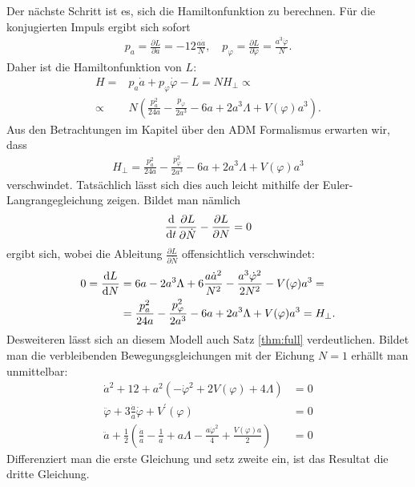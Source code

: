\documentclass{scrartcl}
\begin{document}
			Der nächste Schritt ist es, sich die Hamiltonfunktion zu berechnen. Für die konjugierten Impuls ergibt sich sofort
			\begin{align}
				p_a=\frac{\partial L}{\partial \dot{a}}=-12\frac{a\dot{a}}{N},\quad p_\varphi=\frac{\partial L}{\partial \dot{\varphi}}=\frac{a^3\dot{\varphi}}{N}.
			\end{align}
			Daher ist die Hamiltonfunktion von $L$:
			\begin{align*}
				H=&p_a \dot{a}+p_\varphi \dot{\varphi}-L=N H_\perp\propto\\
				\propto&N\left(\frac{p_a^2}{24a}-\frac{p_\varphi}{2a^3}-6a+2a^3\Lambda+V(\varphi)a^3\right).
			\end{align*}
			Aus den Betrachtungen im Kapitel über den ADM Formalismus erwarten wir, dass
			\begin{align*}
				H_\perp=\frac{p_a^2}{24a}-\frac{p_\varphi^2}{2a^3}-6a+2a^3\Lambda+V(\varphi)a^3
			\end{align*}
			verschwindet. Tatsächlich lässt sich dies auch leicht mithilfe der Euler-Langrangegleichung zeigen. Bildet man nämlich
			\begin{align*}
				\frac{{\rm d}}{{\rm d}t}\frac{\partial L}{\partial \dot{N}}-\frac{\partial L}{\partial N}=0
			\end{align*}
			ergibt sich, wobei die Ableitung $\frac{\partial L}{\partial \dot{N}}$ offensichtlich verschwindet:
			\begin{align*}
				0=\frac{{\rm d}L}{{\rm d } N}&=6a-2a^3 \Lambda+6\frac{a\dot{a}^2}{N^2}-\frac{a^3\dot{\varphi}^2}{2N^2}-V(\varphi)a^3=\\
				&=\frac{p_a^2}{24a}-\frac{p_\varphi^2}{2a^3}-6a+2a^3\Lambda+V(\varphi)a^3=H_\perp.
			\end{align*}
			Desweiteren lässt sich an diesem Modell auch Satz \ref{thm:full} verdeutlichen. Bildet man die verbleibenden Bewegungsgleichungen
			mit der Eichung $N=1$ erhällt man unmittelbar:
			\begin{align}
				\dot{a}^2+12+a^2(-\dot{\varphi}^2+2V(\varphi)+4\Lambda)&=0\\
				\ddot{\varphi}+3\frac{\dot{a}}{a}\dot{\varphi}+V^\prime(\varphi)&=0\\
				\ddot{a}+\frac{1}{2}\left(\frac{\dot{a}}{a}-\frac{1}{a}+a\Lambda-\frac{a\dot{\varphi}^2}{4}+\frac{V(\varphi)a}{2}\right)&=0
			\end{align}
			Differenziert man die erste Gleichung und setz zweite ein, ist das Resultat die dritte Gleichung.
			
\end{document}
